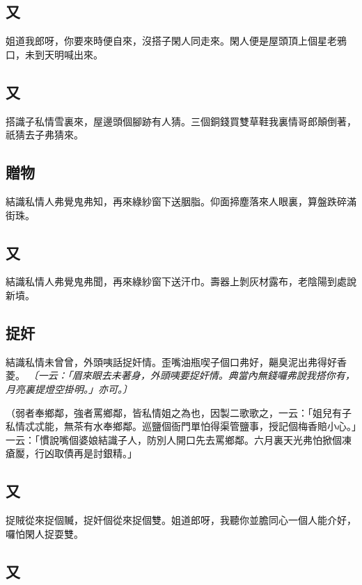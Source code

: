 \subsection*{又}

姐道我郎呀，你要來時便自來，沒搭子閑人同走來。閑人便是屋頭頂上個星老鴉口，未到天明喊出來。

\subsection*{又}

搭識子私情雪裏來，屋邊頭個腳跡有人猜。三個銅錢買雙草鞋我裏情哥郎顛倒著，祇猜去子弗猜來。

\subsection*{贈物}

結識私情人弗覺鬼弗知，再來綠紗窗下送胭脂。仰面揥塵落來人眼裏，算盤跌碎滿街珠。

\subsection*{又}

結識私情人弗覺鬼弗聞，再來綠紗窗下送汗巾。壽器上剝灰材露布，老陰陽到處說新墳。

\subsection*{捉奸}

結識私情未曾曾，外頭咦話捉奸情。歪嘴油瓶喫子個口弗好，齆臭泥出弗得好香菱。
\textit{〔一云：「眉來眼去未著身，外頭咦要捉奸情。典當內無錢囉弗說我搭你有，月亮裏提燈空掛明。」亦可。〕}

（弱者奉鄉鄰，強者罵鄉鄰，皆私情姐之為也，因製二歌歌之，一云：「姐兒有子私情忒忒能，無茶有水奉鄉鄰。巡鹽個衙門單怕得渠管鹽事，授記個梅香賠小心。」一云：「慣說嘴個婆娘結識子人，防別人開口先去罵鄉鄰。六月裏天光弗怕掀個凍瘡𥀬，行凶取債再是討銀精。」

\subsection*{又}

捉賊從來捉個贓，捉奸個從來捉個雙。姐道郎呀，我聽你並膽同心一個人能介好，囉怕閑人捉耍雙。

\subsection*{又}

